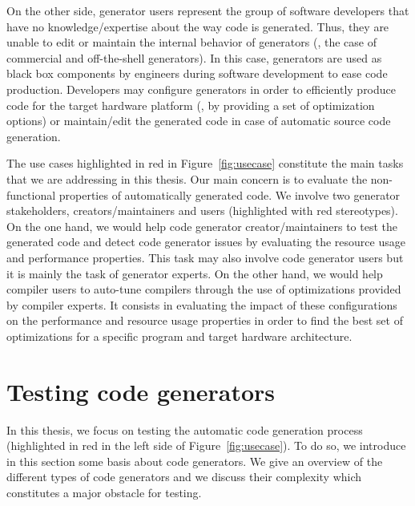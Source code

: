 On the other side, generator users represent the group of software developers that have no knowledge/expertise about the way code is generated. Thus, they are unable to edit or maintain the internal behavior of generators (\eg, the case of commercial and off-the-shell generators). In this case, generators are used as black box components by engineers during software development to ease code production. Developers may configure generators in order to efficiently produce code for the target hardware platform (\eg, by providing a set of optimization options) or maintain/edit the generated code in case of automatic source code generation.

The use cases highlighted in red in Figure~\ref{fig:usecase} constitute the main tasks that we are addressing in this thesis. Our main concern is to evaluate the non-functional properties of automatically generated code. We involve two generator stakeholders, creators/maintainers and users (highlighted with red stereotypes). 
On the one hand, we would help code generator creator/maintainers to test the generated code and detect code generator issues by evaluating the resource usage and performance properties. This task may also involve code generator users but it is mainly the task of generator experts.
On the other hand, we would help compiler users to auto-tune compilers through the use of optimizations provided by compiler experts. It consists in evaluating the impact of these configurations on the performance and resource usage properties in order to find the best set of optimizations for a specific program and target hardware architecture.


\section{Testing code generators}
\label{bg:Testing code generators}
In this thesis, we focus on testing the automatic code generation process (highlighted in red in the left side of Figure~\ref{fig:usecase}). To do so, we introduce in this section some basis about code generators. We give an overview of the different types of code generators and we discuss their complexity which constitutes a major obstacle for testing.

